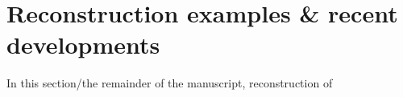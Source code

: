 \section{Reconstruction examples & recent developments}

In this section/the remainder of the manuscript, reconstruction of 